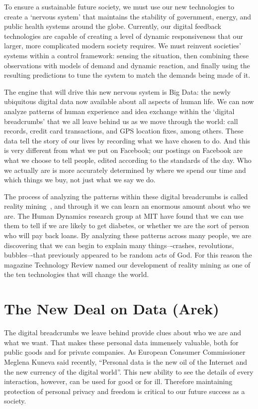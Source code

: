 To ensure a sustainable future society, we must use our new technologies to create a `nervous system’ that maintains the stability of government, energy, and public health systems around the globe.
Currently, our digital feedback technologies are capable of creating a level of dynamic responsiveness that our larger, more complicated modern society requires.
We must reinvent societies’ systems within a control framework: sensing the situation, then combining these observations with models of demand and dynamic reaction, and finally using the resulting predictions to tune the system to match the demands being made of it.

The engine that will drive this new nervous system is Big Data: the newly ubiquitous digital data now available about all aspects of human life.
We can now analyze patterns of human experience and idea exchange within the `digital breadcrumbs’ that we all leave behind us as we move through the world: call records, credit card transactions, and GPS location fixes, among others.
These data tell the story of our lives by recording what we have chosen to do.
And this is very different from what we put on Facebook; our postings on Facebook are what we choose to tell people, edited according to the standards of the day.
Who we actually are is more accurately determined by where we spend our time and which things we buy, not just what we say we do.

The process of analyzing the patterns within these digital breadcrumbs is called reality mining~\cite{eagle2006reality,pentland2009reality}, and through it we can learn an enormous amount about who we are.
The Human Dynamics research group at MIT have found that we can use them to tell if we are likely to get diabetes, or whether we are the sort of person who will pay back loans.
By analyzing these patterns across many people, we are discovering that we can begin to explain many things–-crashes, revolutions, bubbles–-that previously appeared to be random acts of God.
For this reason the magazine Technology Review named our development of reality mining as one of the ten technologies that will change the world\cite{greene2008reality}. 

\section{The New Deal on Data (Arek)}

The digital breadcrumbs we leave behind provide clues about who we are and what we want.
That makes these personal data immensely valuable, both for public goods and for private companies.
As European Consumer Commissioner Meglena Kuneva said recently, ``Personal data is the new oil of the Internet and the new currency of the digital world''.
This new ability to see the details of every interaction, however, can be used for good or for ill.
Therefore maintaining protection of personal privacy and freedom is critical to our future success as a society.

